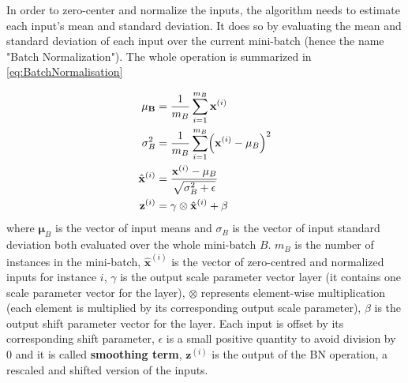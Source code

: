 \documentclass[12pt, letterpaper]{article}
\theoremstyle{definition}
\newcommand{\x}{\mathbf{x}}
\DeclarePairedDelimiter\autobracket{(}{)}
\newcommand{\br}[1]{\autobracket*{#1}}
\let\tb\textbf
\begin{document}
In order to zero-center and normalize the inputs, the algorithm needs to estimate each input's mean and standard deviation. It does so by evaluating the mean and standard deviation of each input over the current mini-batch (hence the name "Batch Normalization"). The whole operation is summarized in \autoref{eq:BatchNormalisation}

\begin{equation}
\begin{aligned}
\mathbf{\mu_B} &= \frac{1}{m_B} \sum_{i=1}^{m_B} \x^{(i)} \\
\mathbf{\sigma}_B^2 &= \frac{1}{m_B} \sum_{i=1}^{m_B} \br{\x^{(i)} - \mathbf{\mu}_B}^2\\
\hat{\mathbf{x}}^{(i)} &= \frac{\x^{(i)} - \mathbf{\mu}_B}{\sqrt{\mathbf{\sigma}_B^2 +\epsilon}}\\
\mathbf{z}^{(i)} &= \mathbf{\gamma} \otimes \hat{\mathbf{x}}^{(i)} + \mathbf{\beta}
\end{aligned}
\label{eq:BatchNormalisation}
\end{equation}
where $\mathbf{\mu}_B$ is the vector of input means and $\sigma_B$ is the vector of input standard deviation both evaluated over the whole mini-batch $B$. $m_B$ is the number of instances in the mini-batch, $\hat{\mathbf{x}}^{(i)}$ is the vector of zero-centred and normalized inputs for instance $i$, $\gamma$ is the output scale parameter vector layer (it contains one scale parameter vector for the layer), $\otimes$ represents element-wise multiplication (each element is multiplied by its corresponding output scale parameter), $\beta$ is the output shift parameter vector for the layer. Each input is offset by its corresponding shift parameter, $\epsilon$ is a small positive quantity to avoid division by $0$ and it is called \tb{smoothing term}, $\mathbf{z}^{(i)}$ is the output of the BN operation, a rescaled and shifted version of the inputs.
\printindex
\end{document}
